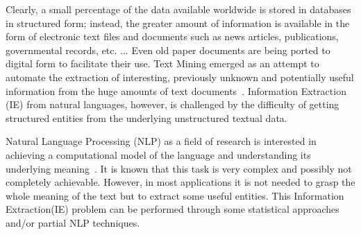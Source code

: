 \documentclass[a4,12pt]{report}
\begin{document}

Clearly, a small percentage of the data available worldwide 
is stored in databases in structured form; instead, the greater amount of information is available in the 
form of electronic text files and documents such as news articles, publications, governmental records, etc. ...
Even old paper documents are being ported to digital form to facilitate their use. 
Text Mining emerged as an attempt to automate the extraction of interesting, 
previously unknown and potentially useful information
from the huge amounts of text documents~\cite{Witten:08}.
Information Extraction (IE) from natural languages, however, is challenged
by the difficulty of getting structured 
entities from the underlying unstructured textual data.


Natural Language Processing (NLP)
as a field of research is interested in achieving a computational model of the language
and understanding its underlying meaning~\cite{sharp:01}. It is known that this task
is very complex and possibly not completely achievable. However, in most applications it 
is not needed to grasp the whole meaning of the text but to extract some useful entities.
This Information Extraction(IE) problem can be performed through some statistical approaches 
and/or partial NLP techniques.
\end{document}
